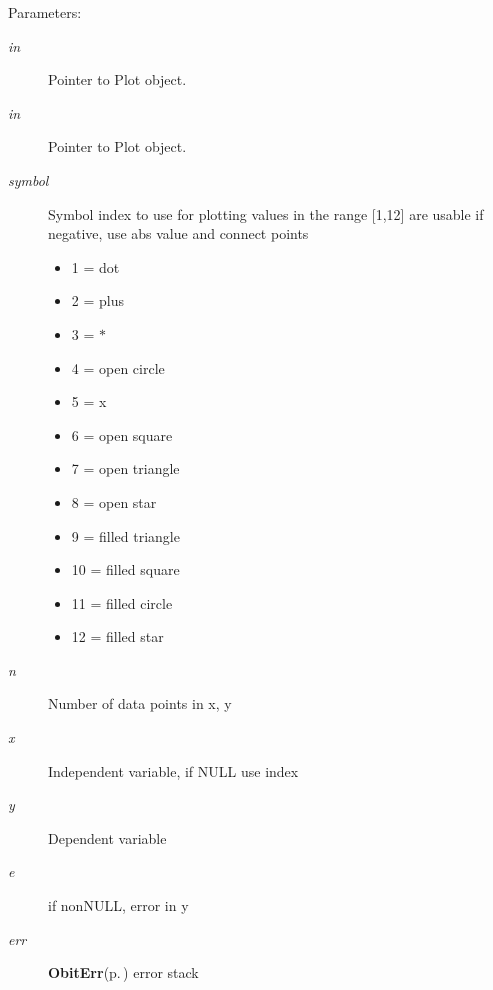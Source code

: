 \begin{Desc}
\item[Parameters:]
\begin{description}
\item[{\em in}]Pointer to Plot object. \item[{\em in}]Pointer to Plot object. \item[{\em symbol}]Symbol index to use for plotting values in the range [1,12] are usable if negative, use abs value and connect points \begin{itemize}
\item 1 = dot \item 2 = plus \item 3 = $\ast$ \item 4 = open circle \item 5 = x \item 6 = open square \item 7 = open triangle \item 8 = open star \item 9 = filled triangle \item 10 = filled square \item 11 = filled circle \item 12 = filled star\end{itemize}
\item[{\em n}]Number of data points in x, y \item[{\em x}]Independent variable, if NULL use index \item[{\em y}]Dependent variable \item[{\em e}]if non\-NULL, error in y \item[{\em err}]{\bf Obit\-Err}{\rm (p.\,\pageref{structObitErr})} error stack\end{description}
\end{Desc}
